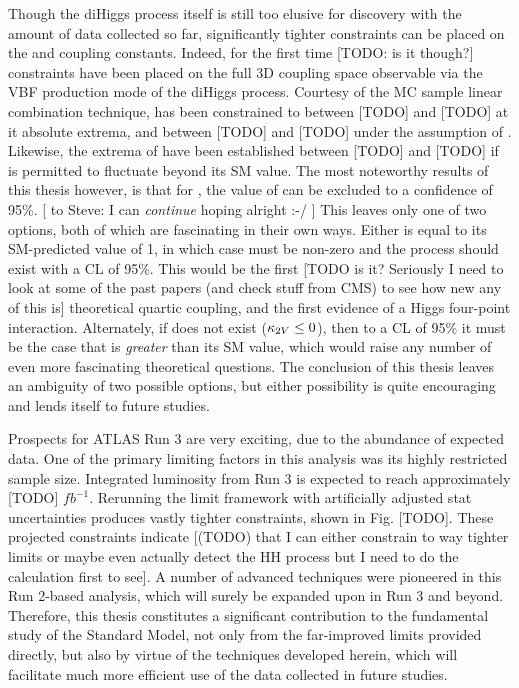 Though the diHiggs process itself is still too elusive for discovery with the amount of data collected so far,
    significantly tighter constraints can be placed on the \kvv and \kl coupling constants.
Indeed, for the first time [TODO: is it though?] constraints have been placed on the full
    3D coupling space observable via the VBF production mode of the diHiggs process.
Courtesy of the MC sample linear combination technique,
    \kl has been constrained to between [TODO] and [TODO] at it absolute extrema,
    and between [TODO] and [TODO] under the assumption of .
Likewise, the extrema of \kvv have been established between [TODO] and [TODO] if \kl is permitted to fluctuate beyond its SM value.
The most noteworthy results of this thesis however, is that for ,
    the value of  can be excluded to a confidence of 95\%. [ to Steve: I can \textit{continue} hoping alright :-/ ]
This leaves only one of two options, both of which are fascinating in their own ways.
Either \kl is equal to its SM-predicted value of 1,
    in which case \kvv must be non-zero and the \HHVV process should exist with a CL of 95\%.
This would be the first
    [TODO is it? Seriously I need to look at some of the past papers (and check stuff from CMS) to see how new any of this is]
    theoretical quartic coupling,
    and the first evidence of a Higgs four-point interaction.
Alternately, if \kvv does not exist ($\kappa_{2V} \leq 0$), then to a CL of 95\% it must be the case
    that \kl is \textit{greater} than its SM value, which would raise any number of even more fascinating theoretical questions.
The conclusion of this thesis leaves an ambiguity of two possible options,
    but either possibility is quite encouraging and lends itself to future studies.

Prospects for ATLAS Run 3 are very exciting, due to the abundance of expected data.
One of the primary limiting factors in this analysis was its highly restricted sample size.
Integrated luminosity from Run 3 is expected to reach approximately [TODO] $\textit{fb}^{-1}$.
Rerunning the limit framework with artificially adjusted stat uncertainties produces vastly tighter constraints,
    shown in Fig. [TODO].
These projected constraints indicate [(TODO) that I can either constrain to way tighter limits or maybe even actually detect the HH process
    but I need to do the calculation first to see].
A number of advanced techniques were pioneered in this Run 2-based analysis,
    which will surely be expanded upon in Run 3 and beyond.
Therefore, this thesis constitutes a significant contribution to the fundamental study of the Standard Model,
    not only from the far-improved limits provided directly,
    but also by virtue of the techniques developed herein,
    which will facilitate much more efficient use of the data collected in future studies.


